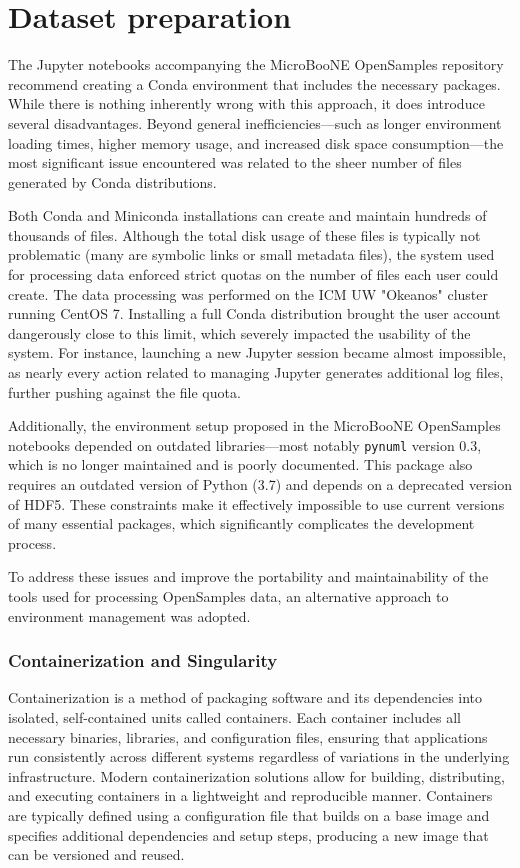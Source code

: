 \documentclass{pracalicmgr}
\begin{document}
\chapter{Dataset preparation}

The Jupyter notebooks accompanying the MicroBooNE OpenSamples repository recommend creating a Conda environment that includes the necessary packages. While there is nothing inherently wrong with this approach, it does introduce several disadvantages. Beyond general inefficiencies—such as longer environment loading times, higher memory usage, and increased disk space consumption—the most significant issue encountered was related to the sheer number of files generated by Conda distributions.

Both Conda and Miniconda installations can create and maintain hundreds of thousands of files. Although the total disk usage of these files is typically not problematic (many are symbolic links or small metadata files), the system used for processing data enforced strict quotas on the number of files each user could create. The data processing was performed on the ICM UW "Okeanos" cluster running CentOS 7. Installing a full Conda distribution brought the user account dangerously close to this limit, which severely impacted the usability of the system. For instance, launching a new Jupyter session became almost impossible, as nearly every action related to managing Jupyter generates additional log files, further pushing against the file quota.

Additionally, the environment setup proposed in the MicroBooNE OpenSamples notebooks depended on outdated libraries—most notably \texttt{pynuml} version 0.3, which is no longer maintained and is poorly documented. This package also requires an outdated version of Python (3.7) and depends on a deprecated version of HDF5. These constraints make it effectively impossible to use current versions of many essential packages, which significantly complicates the development process.

To address these issues and improve the portability and maintainability of the tools used for processing OpenSamples data, an alternative approach to environment management was adopted.

\subsection{Containerization and Singularity}

Containerization is a method of packaging software and its dependencies into isolated, self-contained units called containers. Each container includes all necessary binaries, libraries, and configuration files, ensuring that applications run consistently across different systems regardless of variations in the underlying infrastructure. Modern containerization solutions allow for building, distributing, and executing containers in a lightweight and reproducible manner. Containers are typically defined using a configuration file that builds on a base image and specifies additional dependencies and setup steps, producing a new image that can be versioned and reused.
\end{document}
